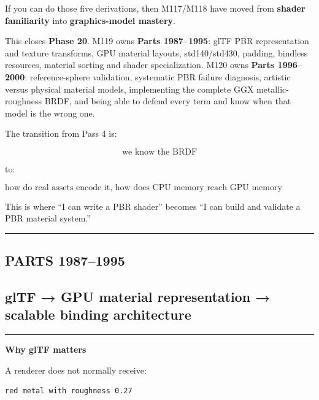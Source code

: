 If you can do those five derivations, then M117/M118 have moved from \textbf{shader familiarity} into \textbf{graphics-model mastery}.

This closes \textbf{Phase 20}. M119 owns \textbf{Parts 1987--1995}: glTF PBR representation and texture transforms, GPU material layouts, std140/std430, padding, bindless resources, material sorting and shader specialization. M120 owns \textbf{Parts 1996--2000}: reference-sphere validation, systematic PBR failure diagnosis, artistic versus physical material models, implementing the complete GGX metallic-roughness BRDF, and being able to defend every term and know when that model is the wrong one.

The transition from Pass 4 is:

\[
\boxed{
\text{we know the BRDF}
}
\]

to:

\[
\boxed{
\text{how do real assets encode it, how does CPU memory reach GPU memory correctly, how do thousands of materials scale, and how do we prove the resulting renderer is actually correct?}
}
\]

This is where ``I can write a PBR shader'' becomes ``I can build and validate a PBR material system.''

\begin{center}\rule{0.5\linewidth}{0.5pt}\end{center}

\subsection{PARTS 1987--1995}\label{03-visual-computing-i-ch006-parts-19871995}

\subsection{glTF → GPU material representation → scalable binding architecture}\label{03-visual-computing-i-ch006-gltf-gpu-material-representation-scalable-binding-architecture}

\begin{center}\rule{0.5\linewidth}{0.5pt}\end{center}

\textbf{Why glTF matters}

A renderer does not normally receive:

\begin{verbatim}
red metal with roughness 0.27
\end{verbatim}

